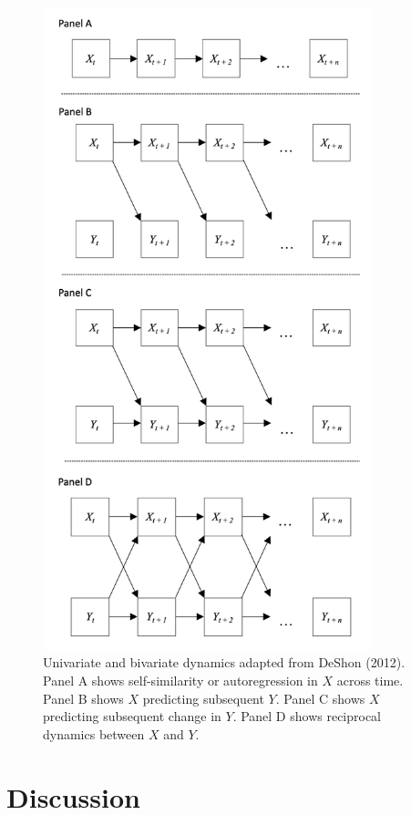 \documentclass[english,,man]{apa6}
\theoremstyle{definition}
\theoremstyle{definition}
\theoremstyle{definition}
\theoremstyle{remark}
\begin{document}
\begin{figure}

{\centering \includegraphics[width=3.75in]{figures/dynamics/dall} 

}

\caption{Univariate and bivariate dynamics adapted from DeShon (2012). Panel A shows self-similarity or autoregression in $X$ across time. Panel B shows $X$ predicting subsequent $Y$. Panel C shows $X$ predicting subsequent change in $Y$. Panel D shows reciprocal dynamics between $X$ and $Y$.\label{dynamics_figure}}\label{fig:unnamed-chunk-20}
\end{figure}

\hypertarget{discussion}{%
\section{Discussion}\label{discussion}}
\end{document}
